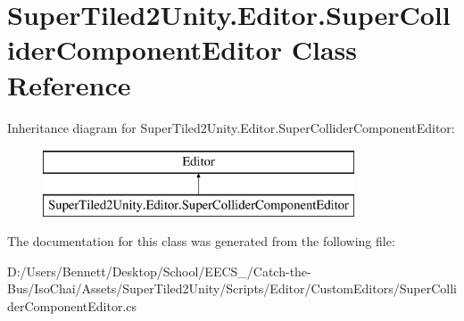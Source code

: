 \hypertarget{class_super_tiled2_unity_1_1_editor_1_1_super_collider_component_editor}{}\section{Super\+Tiled2\+Unity.\+Editor.\+Super\+Collider\+Component\+Editor Class Reference}
\label{class_super_tiled2_unity_1_1_editor_1_1_super_collider_component_editor}
Inheritance diagram for Super\+Tiled2\+Unity.\+Editor.\+Super\+Collider\+Component\+Editor\+:\begin{figure}[H]
\begin{center}
\leavevmode
\includegraphics[height=2.000000cm]{class_super_tiled2_unity_1_1_editor_1_1_super_collider_component_editor}
\end{center}
\end{figure}


The documentation for this class was generated from the following file\+:\begin{DoxyCompactItemize}
\item 
D\+:/\+Users/\+Bennett/\+Desktop/\+School/\+E\+E\+C\+S\+\_/\+Catch-\/the-\/\+Bus/\+Iso\+Chai/\+Assets/\+Super\+Tiled2\+Unity/\+Scripts/\+Editor/\+Custom\+Editors/Super\+Collider\+Component\+Editor.\+cs\end{DoxyCompactItemize}
